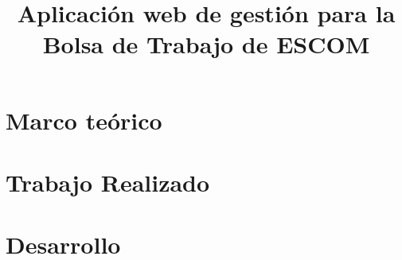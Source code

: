 \documentclass[11pt, twopages]{book}
\date{}
\title{Aplicación web de gestión para la Bolsa de Trabajo de ESCOM}
\author{}
\begin{document}
    \frontmatter
        \maketitle
        \advertisment
        \responsiveletter
        \tableofcontents
        \listoffigures
        \listoftables
    \mainmatter
    

    \label{aloneparts:intro}

    \chapter{Marco teórico}
    \label{aloneparts:marcoteorico}
     
    
    \chapter{Trabajo Realizado}
    \label{trabajorealizado}
      
      
    
    \chapter{Desarrollo}
        
    \appendix

      
      
      
      
      
      

    \medskip

    \printbibliography
        \printbibliography
\end{document}

